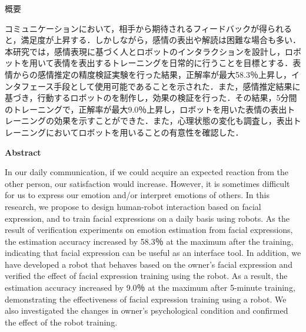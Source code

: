 \documentclass[titlepage]{jarticle}
\begin{document}
\begin{center}
\Huge{概要}
\end{center}
\Large
コミュニケーションにおいて，相手から期待されるフィードバックが得られると，満足度が上昇する．しかしながら，感情の表出や解読は困難な場合も多い．本研究では，感情表現に基づく人とロボットのインタラクションを設計し，ロボットを用いて表情を表出するトレーニングを日常的に行うことを目標とする．表情からの感情推定の精度検証実験を行った結果，正解率が最大58.3$％$上昇し，インタフェース手段として使用可能であることを示された．また，感情推定結果に基づき，行動するロボットのを制作し，効果の検証を行った．その結果，5分間のトレーニングで，正解率が最大9.0$％$上昇し，ロボットを用いた表情の表出トレーニングの効果を示すことができた．また，心理状態の変化も調査し，表出トレーニングにおいてロボットを用いることの有意性を確認した．
\begin{center}
\Huge{\bf{Abstract}}
\end{center}
\Large
In our daily communication, if we could acquire an expected reaction from the other person, our satisfaction would increase. However, it is sometimes difficult for us to express our emotion and/or interpret emotions of others. In this research, we propose to design human-robot interaction based on facial expression, and to train facial expressions on a daily basis using robots. As the result of verification experiments on emotion estimation from facial expressions, the estimation accuracy increased by 58.3$％$ at the maximum after the training, indicating that facial expression can be useful as an interface tool. In addition, we have developed a robot that behaves based on the owner's facial expression and verified the effect of facial expression training using the robot. As a result, the estimation accuracy increased by 9.0$％$ at the maximum after 5-minute training, demonstrating the effectiveness of facial expression training using a robot. We also investigated the changes in owner's psychological condition and confirmed the effect of the robot training.
\normalsize
\newpage
\setcounter{page}{1}
\tableofcontents
\newpage
\listoffigures


\newpage
\listoftables
\newpage
{} 
\cleardoublepage 
\end{document}

